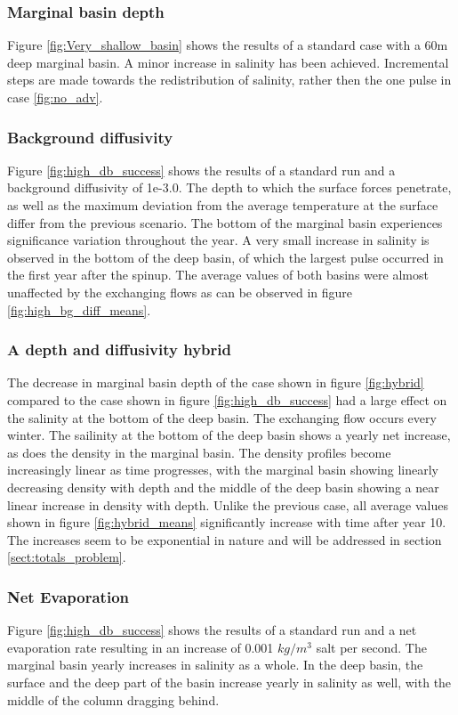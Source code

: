 \documentclass[twocolumn]{article}
\begin{document}
\subsubsection{Marginal basin depth}
\label{sect:mar_basin_depth}
Figure \ref{fig:Very_shallow_basin} shows the results of a standard case with a 60m deep marginal basin. A minor increase in salinity has been achieved. Incremental steps are made towards the redistribution of salinity, rather then the one pulse in case \ref{fig:no_adv}. 


\subsubsection{Background diffusivity}
Figure \ref{fig:high_db_success} shows the results of a standard run and a background diffusivity of 1e-3.0. The depth to which the surface forces penetrate, as well as the maximum deviation from the average temperature at the surface differ from the previous scenario. The bottom of the marginal basin experiences significance variation throughout the year. A very small increase in salinity is observed in the bottom of the deep basin, of which the largest pulse occurred in the first year after the spinup. The average values of both basins were almost unaffected by the exchanging flows as can be observed in figure \ref{fig:high_bg_diff_means}.

\subsubsection{A depth and diffusivity hybrid}
The decrease in marginal basin depth of the case shown in figure \ref{fig:hybrid} compared to the case shown in figure \ref{fig:high_db_success} had a large effect on the salinity at the bottom of the deep basin. The exchanging flow occurs every winter. The sailinity at the bottom of the deep basin shows a yearly net increase, as does the density in the marginal basin. The density profiles become increasingly linear as time progresses, with the marginal basin showing linearly decreasing density with depth and the middle of the deep basin showing a near linear increase in density with depth. 
Unlike the previous case, all average values shown in figure \ref{fig:hybrid_means} significantly increase with time after year 10. The increases seem to be exponential in nature and will be addressed in section \ref{sect:totals_problem}. 

\subsubsection{Net Evaporation}
Figure \ref{fig:high_db_success} shows the results of a standard run and a net evaporation rate resulting in an increase of 0.001 $kg/m^3$ salt per second. The marginal basin yearly increases in salinity as a whole. In the deep basin, the surface and the deep part of the basin increase yearly in salinity as well, with the middle of the column dragging behind.
\end{document}
